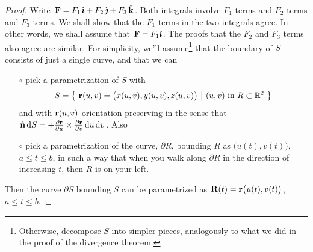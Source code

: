 \begin{proof}
Write $\mathbf{F}=F_1\,\hat{\pmb{\imath}}+F_2\,\hat{\pmb{\jmath}}+F_3\,\hat{\mathbf{k}}$.
Both integrals involve $F_1$ terms and $F_2$ terms and
$F_3$ terms. We shall show that the $F_1$ terms in the two integrals agree.
In other words, we shall assume that $\mathbf{F}=F_1\hat{\pmb{\imath}}$.
The proofs that the $F_2$ and $F_3$ terms also agree are similar.
For simplicity, we'll assume\footnote{Otherwise, decompose $S$ into simpler pieces, analogously to what we did in the proof of the divergence theorem.} 
that the boundary of $S$ consists of just a single curve, and that we can
\begin{itemize}\itemsep1pt \parskip0pt  %
\item[$\circ$]
pick a parametrization of $S$ with
\begin{equation*}
S=\big\{ \ \mathbf{r}(u,v)=\big(x(u,v),y(u,v),z(u,v)\big)\ \big|\  (u,v)\text{ in }
                 R\subset\mathbb{R}^2\ \big\}
\end{equation*}
and with $\mathbf{r}(u,v)$ orientation preserving in the sense that
$\hat{\mathbf{n}}\,\mathrm{d}S = +\frac{\partial \mathbf{r}}{\partial u}
\times \frac{\partial \mathbf{r}}{\partial v}\,\mathrm{d}u\,\mathrm{d}v$. Also
\item[$\circ$] pick a parametrization of the curve, $\partial R$, bounding $R$ as 
$\big( u(t), v(t)\big)$, $a\le t\le b$, in such a way that 
when you walk along $\partial R$ in the direction of increasing $t$, then $R$ 
is on your left. 
\end{itemize}
Then the curve $\partial S$ bounding $S$ 
can be parametrized as $\mathbf{R}(t)=\mathbf{r}\big(u(t),v(t)\big)$, $a\le t\le b$.
\end{proof}
